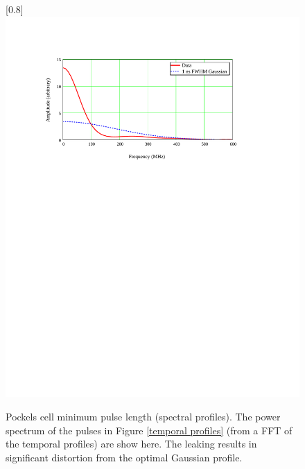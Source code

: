 \begin{figure}
\scalebox{0.8}[0.8]{
\includegraphics[bb=20 494 481 690]
{spectral_profiles/spectral_profiles.pdf}
}
\caption[Pockels cell minimum pulse length (spectral profiles)]{Pockels cell minimum pulse length (spectral profiles). The power spectrum of the pulses in Figure \ref{temporal profiles} (from a FFT of the temporal profiles) are show here. The leaking results in significant distortion from the optimal Gaussian profile.}
\label{spectral profiles}
\end{figure}
